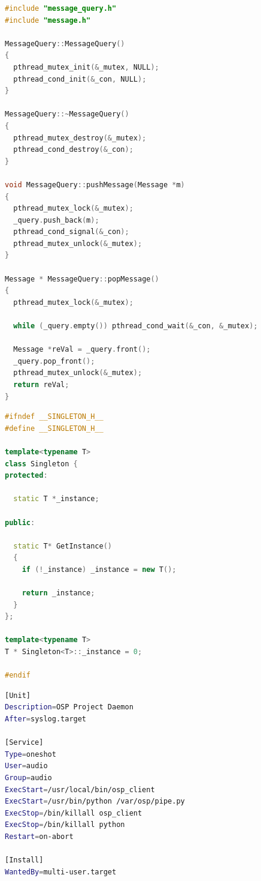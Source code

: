 \documentclass[11pt,a4paper,titlepage]{report}
\begin{document}
\begin{lstlisting}[caption=message-query.cpp,language=C++]
#include "message_query.h"
#include "message.h"

MessageQuery::MessageQuery()
{
  pthread_mutex_init(&_mutex, NULL);
  pthread_cond_init(&_con, NULL);
}

MessageQuery::~MessageQuery()
{
  pthread_mutex_destroy(&_mutex);
  pthread_cond_destroy(&_con);
}

void MessageQuery::pushMessage(Message *m)
{
  pthread_mutex_lock(&_mutex);
  _query.push_back(m);
  pthread_cond_signal(&_con);
  pthread_mutex_unlock(&_mutex);
}

Message * MessageQuery::popMessage()
{
  pthread_mutex_lock(&_mutex);

  while (_query.empty()) pthread_cond_wait(&_con, &_mutex);

  Message *reVal = _query.front();
  _query.pop_front();
  pthread_mutex_unlock(&_mutex);
  return reVal;
}
\end{lstlisting}







\begin{lstlisting}[caption=singleton.h,language=C++]
#ifndef __SINGLETON_H__
#define __SINGLETON_H__

template<typename T>
class Singleton {
protected:

  static T *_instance;

public:

  static T* GetInstance()
  {
    if (!_instance) _instance = new T();

    return _instance;
  }
};

template<typename T>
T * Singleton<T>::_instance = 0;

#endif

\end{lstlisting}






\begin{lstlisting}[caption=osp-project-client.service,language=bash]
[Unit]
Description=OSP Project Daemon
After=syslog.target 

[Service]
Type=oneshot
User=audio
Group=audio
ExecStart=/usr/local/bin/osp_client
ExecStart=/usr/bin/python /var/osp/pipe.py
ExecStop=/bin/killall osp_client
ExecStop=/bin/killall python
Restart=on-abort

[Install]
WantedBy=multi-user.target
\end{lstlisting}
\end{document}
